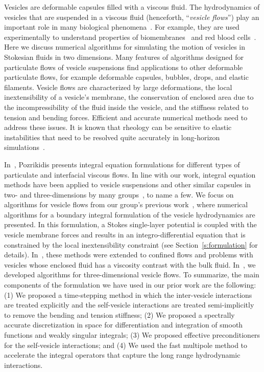 Vesicles are deformable capsules filled with a viscous fluid. The
hydrodynamics of vesicles that are suspended in a viscous fluid
(henceforth, ``{\em vesicle flows}'') play an important role in many
biological phenomena~\cite{kraus1996,seifert}.  For example, they are
used experimentally to understand properties of
biomembranes~\cite{sackmann1996} and red blood
cells~\cite{noguchi2005,pozrikidis1990,ghigliotti-biros-e10,kaoui-tahiri-biros-misbah-e11,misbah2006}.
Here we discuss numerical algorithms for simulating the motion of
vesicles in Stokesian fluids in two dimensions.  Many features of
algorithms designed for particulate flows of vesicle suspensions find
applications to other deformable particulate flows, for example
deformable capsules, bubbles, drops, and elastic filaments.  Vesicle
flows are characterized by large deformations, the local
inextensibility of a vesicle's membrane, the conservation of enclosed
area due to the incompressibility of the fluid inside the vesicle, and
the stiffness related to tension and bending forces.  Efficient and
accurate numerical methods need to address these issues.  It is known
that rheology can be sensitive to elastic instabilities that need to be
resolved quite accurately in long-horizon
simulations~\cite{kaoui-biros-misbah09}. 

In~\cite{pozrikidis2001a}, Pozrikidis presents integral equation
formulations for different types of particulate and interfacial viscous
flows.  In line with our work, integral equation methods have been
applied to vesicle suspensions and other similar capsules in two- and
three-dimensions by many
groups~\cite{veerapaneni-e11,rah:vee:bir,shravan,fre:ore2011,fre:zha2010,zha:isf:ols:fre2010,zha:sha2011a,zha:sha2013a,zha:sha2013b,zha:sha:nar2012},
to name a few.  We focus on algorithms for vesicle flows from our
group's previous work~\cite{shravan}, where numerical algorithms for a
boundary integral formulation of the vesicle hydrodynamics are
presented.  In this formulation, a Stokes single-layer potential is
coupled with the vesicle membrane forces and results in an
integro-differential equation that is constrained by the local
inextensibility constraint (see Section~\ref{s:formulation} for
details).  In~\cite{rah:vee:bir}, these methods were extended to
confined flows and problems with vesicles whose enclosed fluid has a
viscosity contrast with the bulk fluid.  In~\cite{veerapaneni-e11}, we
developed algorithms for three-dimensional vesicle flows.  To summarize,
the main components of the formulation we have used in our prior work
are the following: (1) We proposed a time-stepping method in which the
inter-vesicle interactions are treated explicitly and the self-vesicle
interactions are treated semi-implicitly to remove the bending and
tension stiffness; (2) We proposed a spectrally accurate discretization
in space for differentiation and integration of smooth functions and
weakly singular integrals; (3) We proposed effective preconditioners for
the self-vesicle interactions; and (4) We used the fast multipole method
to accelerate the integral operators that capture the long range
hydrodynamic interactions.


